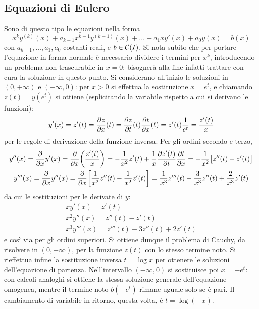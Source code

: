\subsection*{Equazioni di Eulero}
Sono di questo tipo le equazioni nella forma
\begin{equation} \label{eq:eulero}
x^ky^{(k)}(x)+a_{k-1}x^{k-1}y^{(k-1)}(x)+\dots+a_1xy'(x)+a_0y(x)=b(x)
\end{equation}
con $a_{k-1},\dots,a_1,a_0$ costanti reali, e $b\in\mathcal{C}^{{}}(I)$.
Si nota subito che per portare l'equazione in forma normale è necessario dividere i termini per $x^k$, introducendo un problema non trascurabile in $x=0$: bisognerà alla fine infatti trattare con cura la soluzione in questo punto. Si considerano all'inizio le soluzioni in $(0,+\infty)$ e $(-\infty,0)$: per $x>0$ si effettua la sostituzione $x=e^t$, e chiamando $z(t)=y(e^t)$ si ottiene (esplicitando la variabile rispetto a cui si derivano le funzioni):
\[
y'(x)=z'(t)=\frac{\partial {z}}{\partial {x}}(t)=\frac{\partial {z}}{\partial {t}}(t)\frac{\partial {t}}{\partial {x}}(t)=z'(t)\frac1{e^t}=\frac{z'(t)}{x}
\]
per le regole di derivazione della funzione inversa.
Per gli ordini secondo e terzo,
\begin{gather*}
y''(x)=\frac{\partial {}}{\partial {x}}y'(x)=\frac{\partial {}}{\partial {x}}\bigg(\frac{z'(t)}{x}\bigg)=-\frac1{x^2}z'(t)+\frac1{x}\frac{\partial {z'(t)}}{\partial {t}}\frac{\partial {t}}{\partial {x}}=-\frac1{x^2}\big[z''(t)-z'(t)\big]\\
y'''(x)=\frac{\partial {}}{\partial {x}}y''(x)=\frac{\partial {}}{\partial {x}}\bigg[\frac1{x^2}z''(t)-\frac1{x^2}z'(t)\bigg]=\frac1{x^3}z'''(t)-\frac3{x^3}z''(t)+\frac2{x^3}z'(t)
\end{gather*}
da cui le sostituzioni per le derivate di $y$:
\begin{equation} \label{eq:sostituzioni_eulero}
\begin{gathered}
xy'(x)=z'(t)\\
x^2y''(x)=z''(t)-z'(t)\\
x^3y'''(x)=z'''(t)-3z''(t)+2z'(t)
\end{gathered}
\end{equation}
e così via per gli ordini superiori.
Si ottiene dunque il problema di Cauchy, da risolvere in $(0,+\infty)$, per la funzione $z(t)$ con lo stesso termine noto. Si rieffettua infine la sostituzione inversa $t=\log x$ per ottenere le soluzioni dell'equazione di partenza.
Nell'intervallo $(-\infty,0)$ si sostituisce poi $x=-e^t$: con calcoli analoghi si ottiene la stessa soluzione generale dell'equazione omogenea, mentre il termine noto $b(-e^t)$ rimane uguale solo se è pari. Il cambiamento di variabile in ritorno, questa volta, è $t=\log(-x)$.


